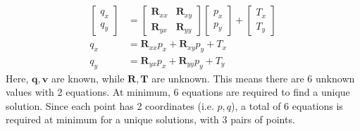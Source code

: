 \documentclass[]{article}
\begin{document}
\begin{align}
	\begin{bmatrix}
	q_x \\
	q_y
	\end{bmatrix}
	&=
	\begin{bmatrix}
	\mathbf{R}_{xx} & \mathbf{R}_{xy} \\
	\mathbf{R}_{yx} & \mathbf{R}_{yy}
	\end{bmatrix}
	\begin{bmatrix}
	p_x \\
	p_y
	\end{bmatrix}
	+
	\begin{bmatrix}
	T_x \\
	T_y
	\end{bmatrix} \\
	q_x &= \mathbf{R}_{xx} p_x + \mathbf{R}_{xy} p_y + T_x \\
	q_y &= \mathbf{R}_{yx} p_x + \mathbf{R}_{yy} p_y + T_y
\end{align}
Here, \(\mathbf{q,v}\) are known, while \(\mathbf{R,T}\) are unknown. This means there are 6 unknown values with 2 equations. At minimum, 6 equations are required to find a unique solution. Since each point has 2 coordinates (i.e. \(p,q\)), a total of 6 equations is required at minimum for a unique solutions, with 3 pairs of points. 

\subsection{}
\end{document}
